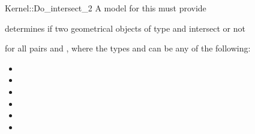 \begin{ccRefFunctionObjectConcept}{Kernel::Do_intersect_2}
A model for this must provide


{determines if two geometrical objects of type 
 and  intersect or not}

for all pairs  and , where
the types  and  can be any of the
following:
\begin{itemize}
\item {}
\item {}
\item {}
\item {}
\item {}
\item {}
\end{itemize}

\end{ccRefFunctionObjectConcept}
